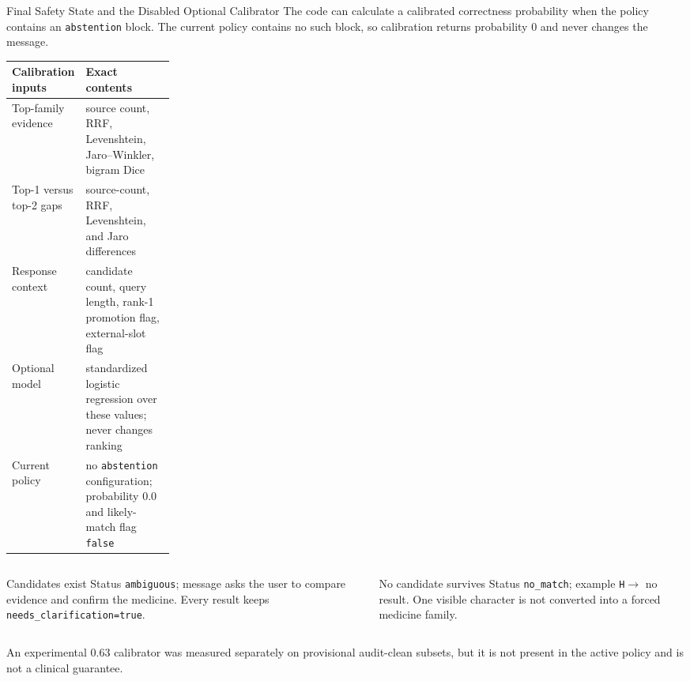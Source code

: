 \documentclass[aspectratio=169,10pt]{beamer}
\newcommand{\code}[1]{\texttt{#1}}
\begin{document}
\begin{frame}{Final Safety State and the Disabled Optional Calibrator}
\scriptsize
The code can calculate a calibrated correctness probability when the policy
contains an \code{abstention} block. The current policy contains no such block,
so calibration returns probability 0 and never changes the message.

\begin{tabularx}{\linewidth}{@{}L{0.24\linewidth}Y@{}}
\toprule
\textbf{Calibration inputs} & \textbf{Exact contents} \\
\midrule
Top-family evidence & source count, RRF, Levenshtein, Jaro--Winkler, bigram Dice \\
Top-1 versus top-2 gaps & source-count, RRF, Levenshtein, and Jaro differences \\
Response context & candidate count, query length, rank-1 promotion flag, external-slot flag \\
Optional model & standardized logistic regression over these values; never changes ranking \\
Current policy & no \code{abstention} configuration; probability $0.0$ and likely-match flag \code{false} \\
\bottomrule
\end{tabularx}

\vspace{2mm}
\begin{columns}[T,onlytextwidth]
\begin{block}{Candidates exist}
Status \code{ambiguous}; message asks the user to compare evidence and confirm
the medicine. Every result keeps \code{needs\_clarification=true}.
\end{block}
\begin{alertblock}{No candidate survives}
Status \code{no\_match}; example \code{H}$\rightarrow$ no result. One visible
character is not converted into a forced medicine family.
\end{alertblock}
\end{columns}

\vspace{1mm}
An experimental 0.63 calibrator was measured separately on provisional
audit-clean subsets, but it is not present in the active policy and is not a
clinical guarantee.
\end{frame}
\end{document}
